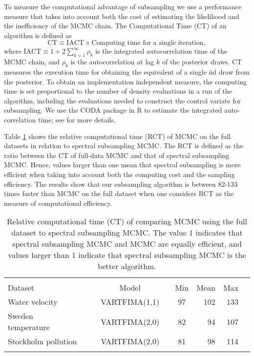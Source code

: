 \documentclass[11pt,english,oneside]{amsart}
\numberwithin{equation}{section}
\theoremstyle{plain}
\numberwithin{equation}{section}
\begin{document}
To measure the computational advantage of subsampling we use a performance measure that takes into account both the cost of estimating the likelihood and the inefficiency of the MCMC chain. The Computational Time (CT) of an algorithm is defined as
\begin{equation}
    \mathrm{CT} \equiv \mathrm{IACT} \times \text{Computing time for a single iteration},
\end{equation}
where $\mathrm{IACT} \equiv 1 +2\sum_{k=1}^\infty \rho_k$ is the integrated autocorrelation time of the MCMC chain, and $\rho_k$ is the autocorrelation at lag $k$ of the posterior draws. CT measures the execution time for obtaining the equivalent of a single iid draw from the posterior. To obtain an implementation independent measure, the computing time is set proportional to the number of density evaluations in a run of the algorithm, including the evaluations needed to construct the control variate for subsampling. We use the {\sf CODA} package \citep{plummer2006coda} in {\sf R} to estimate the integrated auto-correlation time; see \cite{quiroz2019speeding} for more details.

Table \ref{tab:Relative_CT} shows the relative computational time (RCT) of MCMC on the full datasets in relation to spectral subsampling MCMC. The RCT is defined as the ratio between the CT of full-data MCMC and that of spectral subsampling MCMC. Hence, values larger than one mean that spectral subsampling is more efficient when taking into account both the computing cost and the sampling efficiency. The results show that our subsampling algorithm is between 82-133 times faster than MCMC on the full dataset when one considers RCT as the measure of computational efficiency.
\begin{table}[]
\begin{tabular}{lcrrrcrrr}
\hline 
 &  &  & \multicolumn{2}{c}{\vspace{-0.25cm}
} &  & \multicolumn{2}{c}{} & \tabularnewline
\multicolumn{1}{l}{Dataset} & \multicolumn{1}{c}{} &  & \multicolumn{1}{c}{Model} & \multicolumn{1}{c}{} & Min & \multicolumn{1}{c}{Mean} & \multicolumn{1}{c}{Max} & \tabularnewline
\cline{1-1} \cline{4-4} \cline{6-8} \cline{7-8} \cline{8-8} 
Water velocity &  &  & VARTFIMA(1,1) &  & 97 & 102 & 133 & \tabularnewline
Sweden temperature &  &  & VARTFIMA(2,0) &  & 82 & 94 & 107 & \tabularnewline
Stockholm pollution &  &  & VARTFIMA(2,0) &  & 81 & 98 & 114 & \tabularnewline
 &  &  & \vspace{-0.35cm}
 &  &  &  &  & \tabularnewline
\hline 
\end{tabular}
\caption{Relative computational time (CT) of comparing MCMC using the full dataset to spectral subsampling MCMC. The value $1$ indicates that spectral subsampling MCMC and MCMC are equally efficient, and values larger than 1 indicate that spectral subsampling MCMC is the better algorithm. }\label{tab:Relative_CT}
\end{table}
\end{document}

